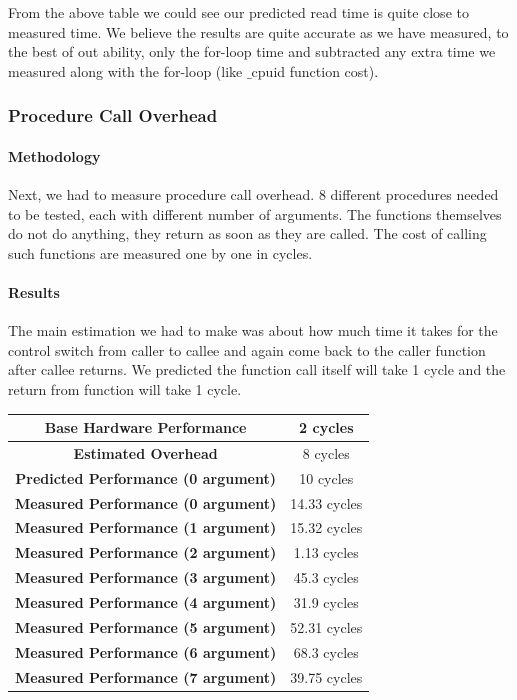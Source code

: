 \documentclass[conference]{IEEEtran}
\begin{document}
From the above table we could see our predicted read time is quite close to measured time. 
We believe the results are quite accurate as we have measured, to the best of out ability, only the for-loop time and subtracted any extra time we measured along with the for-loop (like $\_$cpuid function cost).



\subsubsection{Procedure Call Overhead}

\paragraph{Methodology}

Next, we had to measure procedure call overhead. 8 different procedures needed to be tested, each with different number of arguments. The functions themselves do not do anything, they return as soon as they are called. The cost of calling such functions are measured one by one in cycles.  

\paragraph{Results}

The main estimation we had to make was about how much time it takes for the control switch from caller to callee and again come back to the caller function after callee returns. We predicted the function call itself will take 1 cycle and the return from function will take 1 cycle. 

\begin{center}
\begin{tabular}{ |c|c| } 
  \hline
  \textbf{Base Hardware Performance} & 2 cycles \\ 
  \hline
  \textbf{Estimated Overhead} &  8 cycles \\ 
  \hline
  \textbf{Predicted Performance (0 argument)} & 10 cycles \\ 
  \hline
  \textbf{Measured Performance (0 argument)} & 14.33 cycles \\ 
  \hline
  \textbf{Measured Performance (1 argument)} & 15.32 cycles \\ 
  \hline
  \textbf{Measured Performance (2 argument)} & 1.13 cycles \\ 
  \hline
  \textbf{Measured Performance (3 argument)} & 45.3 cycles \\ 
  \hline
  \textbf{Measured Performance (4 argument)} & 31.9 cycles \\ 
  \hline
  \textbf{Measured Performance (5 argument)} & 52.31 cycles \\ 
  \hline
  \textbf{Measured Performance (6 argument)} & 68.3 cycles \\ 
  \hline
  \textbf{Measured Performance (7 argument)} & 39.75 cycles \\ 
  \hline
\end{tabular}
\end{center}
\end{document}
